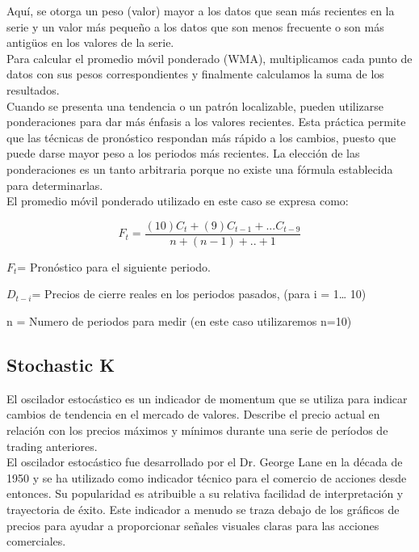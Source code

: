 \documentclass[letter, 12pt]{article}
\begin{document}
Aquí, se otorga un peso (valor) mayor a los datos que sean más recientes en la serie y un valor  más pequeño a los datos que son menos frecuente o son más antigüos en los valores de la serie.\\

Para calcular el promedio móvil ponderado (WMA), multiplicamos cada punto de datos con sus pesos correspondientes y finalmente calculamos la suma de los resultados.\\

Cuando se presenta una tendencia o un patrón localizable, pueden utilizarse ponderaciones para dar más énfasis a los valores recientes. Esta práctica permite que las técnicas de pronóstico respondan más rápido a los cambios,
puesto que puede darse mayor peso a los periodos más recientes. La elección de las ponderaciones es un tanto arbitraria porque no existe una fórmula establecida para determinarlas.\\

El promedio móvil ponderado utilizado en este caso se expresa como:

$$F_{t}=\frac{(10)C_{t}+(9)C_{t-1}+...C_{t-9}}{n+(n-1)+..+1} $$

$F_{t}$= Pronóstico para el siguiente periodo.

$D_{t-i}$= Precios de cierre reales en los periodos pasados, (para i = 1… 10)

n = Numero de periodos para medir (en este caso utilizaremos n=10)

\subsection{Stochastic K}

El oscilador estocástico es un indicador de momentum que se utiliza para indicar cambios de tendencia en el mercado de valores. Describe el precio actual en relación con los precios máximos y mínimos durante una serie de períodos de trading anteriores. \\

El oscilador estocástico fue desarrollado por el Dr. George Lane en la década de 1950 y se ha utilizado como indicador técnico para el comercio de acciones desde entonces. Su popularidad es atribuible a su relativa facilidad de interpretación y trayectoria de éxito. Este indicador a menudo se traza debajo de los gráficos de precios para ayudar a proporcionar señales visuales claras para las acciones comerciales.\\
\end{document}
